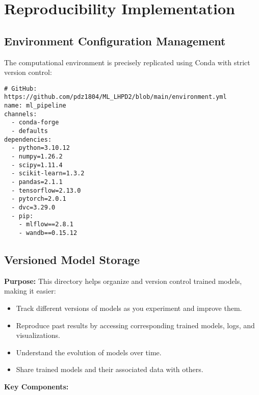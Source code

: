 \section{Reproducibility Implementation}
\subsection{Environment Configuration Management}
The computational environment is precisely replicated using Conda with strict version control:

\begin{lstlisting}[caption={Conda Environment Specification},label={lst:env}]
# GitHub: https://github.com/pdz1804/ML_LHPD2/blob/main/environment.yml
name: ml_pipeline
channels:
  - conda-forge
  - defaults
dependencies:
  - python=3.10.12
  - numpy=1.26.2
  - scipy=1.11.4
  - scikit-learn=1.3.2
  - pandas=2.1.1
  - tensorflow=2.13.0
  - pytorch=2.0.1
  - dvc=3.29.0
  - pip:
    - mlflow==2.8.1
    - wandb==0.15.12
\end{lstlisting}

\subsection{Versioned Model Storage}

\textbf{Purpose:}  
This directory helps organize and version control trained models, making it easier:  

\begin{itemize}
    \item Track different versions of models as you experiment and improve them.
    \item Reproduce past results by accessing corresponding trained models, logs, and visualizations.
    \item Understand the evolution of models over time.
    \item Share trained models and their associated data with others.
\end{itemize}

\textbf{Key Components:}  

